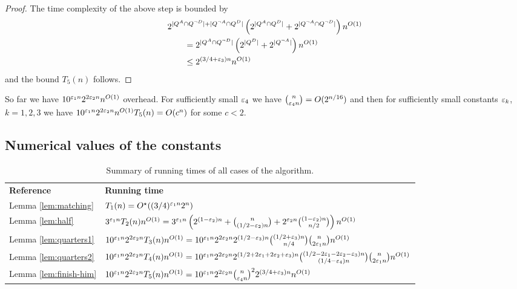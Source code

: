\documentclass{article}
\theoremstyle{definition}
\begin{document}
\begin{proof}
The time complexity of the above step is bounded by
\begin{align*}
&2^{|Q^A \cap Q^{\neg D}| + |Q^{\neg A} \cap Q^D|} \left(2^{|Q^A \cap Q^D|} + 2^{|Q^{\neg A} \cap Q^{\neg D}|} \right) n^{O(1)} \\
&\qquad = 2^{|Q^A\cap Q^{\neg D}|} \left(2^{|Q^D|} + 2^{|Q^{\neg A}|}\right) n^{O(1)} \\
&\qquad \leq 2^{(3/4 + \varepsilon_3)n} n^{O(1)}
\end{align*}
and the bound $T_5(n)$ follows.
\end{proof}
So far we have $10^{\varepsilon_1 n} 2^{2\varepsilon_2 n} n^{O(1)}$ overhead. For sufficiently small $\varepsilon_4$ we have $\binom{n}{\varepsilon_4 n} = O(2^{n/16})$ and then for sufficiently small constants $\varepsilon_k$, $k=1,2,3$ we have $10^{\varepsilon_1 n} 2^{2\varepsilon_2 n}n^{O(1)} T_5(n) = O(c^n)$ for some $c < 2$.

\subsection{Numerical values of the constants}\label{sec:values}

\begin{table}[htb]
\begin{center}
\begin{tabular}{|l|l|}
\hline
\textbf{Reference} & \textbf{Running time} \\[2mm]
Lemma \ref{lem:matching} & $T_1(n) = O^\star((3\slash 4)^{\varepsilon_1 n} 2^n)$ \\[2mm]
Lemma \ref{lem:half} & $3^{\varepsilon_1 n} T_2(n) n^{O(1)} = 3^{\varepsilon_1 n} \left( 2^{(1-\varepsilon_2)n} + \binom{n}{(1/2 - \varepsilon_2)n} + 2^{\varepsilon_2 n}\binom{(1-\varepsilon_2)n}{n/2} \right) n^{O(1)}$ \\[2mm]
Lemma \ref{lem:quarters1} & $10^{\varepsilon_1 n} 2^{2\varepsilon_2 n} T_3(n) n^{O(1)} = 10^{\varepsilon_1 n} 2^{2\varepsilon_2 n} 2^{(1/2-\varepsilon_3)n} \binom{(1/2+\varepsilon_3)n}{n/4} \binom{n}{2\varepsilon_1 n} n^{O(1)}$ \\[2mm]
Lemma \ref{lem:quarters2} & $10^{\varepsilon_1 n} 2^{2\varepsilon_2 n} T_4(n) n^{O(1)} = 10^{\varepsilon_1 n} 2^{2\varepsilon_2 n} 2^{(1/2+2\varepsilon_1+2\varepsilon_2+\varepsilon_3)n} \binom{(1/2-2\varepsilon_1-2\varepsilon_2-\varepsilon_3)n}{(1/4-\varepsilon_4)n} \binom{n}{2\varepsilon_1 n} n^{O(1)}$ \\[2mm]
Lemma \ref{lem:finish-him} & $10^{\varepsilon_1 n} 2^{2\varepsilon_2 n} T_5(n) n^{O(1)} = 10^{\varepsilon_1 n} 2^{2\varepsilon_2 n} \binom{n}{\varepsilon_4 n}^2 2^{(3/4+\varepsilon_3)n} n^{O(1)}$ \\[1mm]
        \hline
\end{tabular}
\end{center}
\caption{Summary of running times of all cases of the algorithm.}
\label{table:summary}
\end{table}
\end{document}

